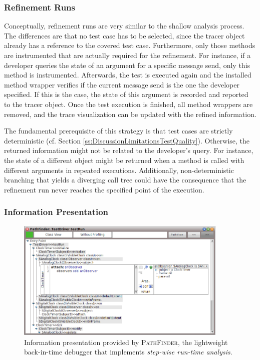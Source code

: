 \subsubsection{Refinement Runs}
Conceptually, refinement runs are very similar to the shallow analysis process.
The differences are that no test case has to be selected, since the tracer object already has a reference to the covered test case.
Furthermore, only those methods are instrumented that are actually required for the refinement.
For instance, if a developer queries the state of an argument for a specific message send, only this method is instrumented.
Afterwards, the test is executed again and the installed method wrapper verifies if the current message send is the one the developer specified.
If this is the case, the state of this argument is recorded and reported to the tracer object.
Once the test execution is finished, all method wrappers are removed, and the trace visualization can be updated with the refined information.

The fundamental prerequisite of this strategy is that test cases are strictly deterministic (cf. Section \ref{ss:DiscussionLimitationsTestQuality}).
Otherwise, the returned information might not be related to the developer's query.
For instance, the state of a different object might be returned when a method is called with different arguments in repeated executions.
Additionally, non-deterministic branching that yields a diverging call tree could have the consequence that the refinement run never reaches the specified point of the execution.

\subsubsection{Information Presentation}

\begin{figure}[tb]
	\centering
	\includegraphics[width=0.9\textwidth]{../images/02-TracingPathFinder}
	\caption[Information Presentation Provided by PathFinder]{Information presentation provided by \textsc{PathFinder}, the lightweight back-in-time debugger that implements \emph{step-wise run-time analysis}.}
	\label{fig:BackgroundPathFinder}
\end{figure}

